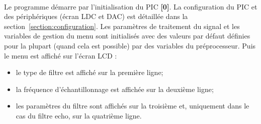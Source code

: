 \documentclass{article}
\begin{document}
    \paragraph{}
    Le programme démarre par l'initialisation du PIC \textbf{[0]}. La configuration du PIC et des périphériques (écran LDC et DAC) est détaillée dans la section~\ref{section:configuration}. Les paramètres de traitement du signal et les variables de gestion du menu sont initialisés avec des valeurs par défaut définies pour la plupart (quand cela est possible) par des variables du préprocesseur. Puis le menu est affiché sur l'écran LCD :
    \begin{itemize}
        \item le type de filtre est affiché sur la première ligne;
        \item la fréquence d'échantillonnage est affichée sur la deuxième ligne;
        \item les paramètres du filtre sont affichés sur la troisième et, uniquement dans le cas du filtre echo, sur la quatrième ligne.
    \end{itemize}
\end{document}
